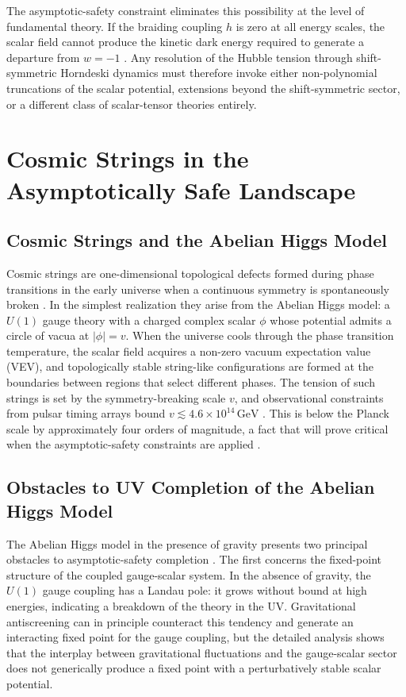 \documentclass[12pt,a4paper]{article}
\begin{document}
The asymptotic-safety constraint eliminates this possibility at the level of
fundamental theory. If the braiding coupling $h$ is zero at all energy scales,
the scalar field cannot produce the kinetic dark energy required to generate a
departure from $w = -1$ \cite{EichhornLinoWagner2023}. Any resolution of the
Hubble tension through shift-symmetric Horndeski dynamics must therefore invoke
either non-polynomial truncations of the scalar potential, extensions beyond
the shift-symmetric sector, or a different class of scalar-tensor theories
entirely.

\section{Cosmic Strings in the Asymptotically Safe Landscape}

\subsection{Cosmic Strings and the Abelian Higgs Model}

Cosmic strings are one-dimensional topological defects formed during phase
transitions in the early universe when a continuous symmetry is spontaneously
broken \cite{Peebles1980}. In the simplest realization they arise from the
Abelian Higgs model: a $U(1)$ gauge theory with a charged complex scalar
$\phi$ whose potential admits a circle of vacua at $|\phi| = v$. When the
universe cools through the phase transition temperature, the scalar field
acquires a non-zero vacuum expectation value (VEV), and topologically stable
string-like configurations are formed at the boundaries between regions that
select different phases. The tension of such strings is set by the
symmetry-breaking scale $v$, and observational constraints from pulsar timing
arrays bound $v \lesssim 4.6\times 10^{14}\,\text{GeV}$ \cite{NANOGrav2023}.
This is below the Planck scale by approximately four orders of magnitude, a
fact that will prove critical when the asymptotic-safety constraints are applied
\cite{EichhornLinoMiqueleto2023}.

\subsection{Obstacles to UV Completion of the Abelian Higgs Model}

The Abelian Higgs model in the presence of gravity presents two principal
obstacles to asymptotic-safety completion \cite{EichhornLinoMiqueleto2023}.
The first concerns the fixed-point structure of the coupled gauge-scalar system.
In the absence of gravity, the $U(1)$ gauge coupling has a Landau pole: it
grows without bound at high energies, indicating a breakdown of the theory in
the UV. Gravitational antiscreening can in principle counteract this tendency
and generate an interacting fixed point for the gauge coupling, but the
detailed analysis shows that the interplay between gravitational fluctuations
and the gauge-scalar sector does not generically produce a fixed point with a
perturbatively stable scalar potential.
\end{document}
